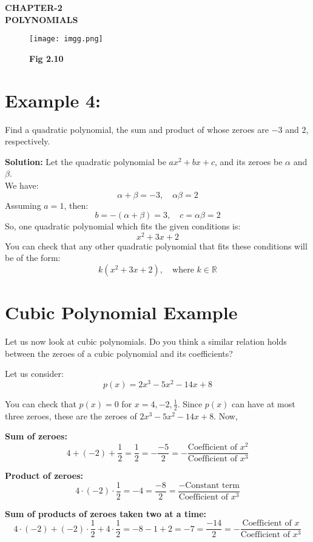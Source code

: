 \documentclass[12pt,twoside]{article}
\newcommand{\solution}{\noindent \textbf{\textcolor{customblue}{Solution:} }}
\begin{document}
\begin{center}
\textbf{\Large \textcolor{customblue}{CHAPTER-2 \\ POLYNOMIALS}}
\end{center}

\begin{figure}[h!]
\centering
\texttt{[image: imgg.png]}
\caption*{\textcolor{customblue}{\textbf{Fig 2.10}}}
\end{figure}


\section*{\textcolor{customblue}{Example 4:}}

Find a quadratic polynomial, the sum and product of whose zeroes are $-3$ and $2$, respectively.

\solution Let the quadratic polynomial be $ax^2 + bx + c$, and its zeroes be $\alpha$ and $\beta$. \\
We have: 
\[\alpha + \beta = -3, \quad \alpha\beta = 2\]
Assuming $a = 1$, then:
\[b = -(\alpha + \beta) = 3, \quad c = \alpha\beta = 2\]
So, one quadratic polynomial which fits the given conditions is:
\[x^2 + 3x + 2\]
You can check that any other quadratic polynomial that fits these conditions will be of the form:
\[k(x^2 + 3x + 2), \quad \text{where } k \in \mathbb{R}\]

\section*{\textcolor{customblue}{Cubic Polynomial Example}}

Let us now look at cubic polynomials. Do you think a similar relation holds between the zeroes of a cubic polynomial and its coefficients?

Let us consider:
\[p(x) = 2x^3 - 5x^2 - 14x + 8\]

You can check that $p(x) = 0$ for $x = 4, -2, \frac{1}{2}$. Since $p(x)$ can have at most three zeroes, these are the zeroes of $2x^3 - 5x^2 - 14x + 8$. Now,

\textbf{Sum of zeroes:}
\[4 + (-2) + \frac{1}{2} = \frac{1}{2} = -\frac{-5}{2} = -\frac{\text{Coefficient of } x^2}{\text{Coefficient of } x^3}\]

\textbf{Product of zeroes:}
\[4 \cdot (-2) \cdot \frac{1}{2} = -4 = \frac{-8}{2} = \frac{-\text{Constant term}}{\text{Coefficient of } x^3}\]

\textbf{Sum of products of zeroes taken two at a time:}
\[4 \cdot (-2) + (-2) \cdot \frac{1}{2} + 4 \cdot \frac{1}{2} = -8 -1 + 2 = -7 = \frac{-14}{2} = -\frac{\text{Coefficient of } x}{\text{Coefficient of } x^3}\]
\end{document}
